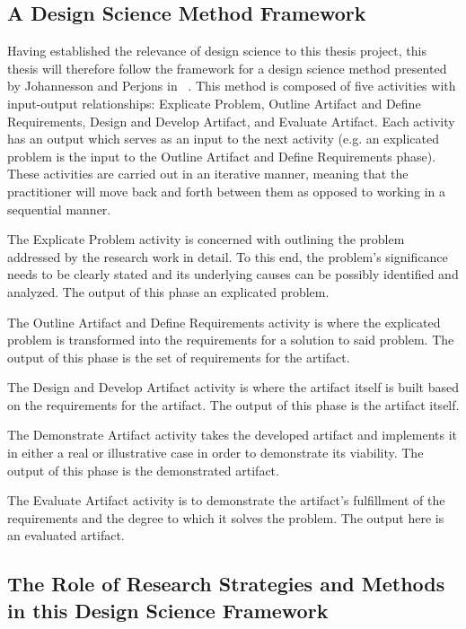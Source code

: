 \subsection{A Design Science Method Framework}
\label{sec:framework}

Having established the relevance of design science to this thesis project, this thesis will therefore follow the framework for a design science method presented by Johannesson and Perjons in ~\cite[Ch. 4]{johannessonPerjons2012}. This method is composed of five activities with input-output relationships: Explicate Problem, Outline Artifact and Define Requirements, Design and Develop Artifact, and Evaluate Artifact. Each activity has an output which serves as an input to the next activity (e.g. an explicated problem is the input to the Outline Artifact and Define Requirements phase). These activities are carried out in an iterative manner, meaning that the practitioner will move back and forth between them as opposed to working in a sequential manner. 

The Explicate Problem activity is concerned with outlining the problem addressed by the research work in detail. To this end, the problem's significance needs to be clearly stated and its underlying causes can be possibly identified and analyzed. The output of this phase an explicated problem. 

The Outline Artifact and Define Requirements activity is where the explicated problem is transformed into the requirements for a solution to said problem. The output of this phase is the set of requirements for the artifact. 

The Design and Develop Artifact activity is where the artifact itself is built based on the requirements for the artifact. The output of this phase is the artifact itself.

The Demonstrate Artifact activity takes the developed artifact and implements it in either a real or illustrative case in order to demonstrate its viability. The output of this phase is the demonstrated artifact. 

The Evaluate Artifact activity is to demonstrate the artifact's fulfillment of the requirements and the degree to which it solves the problem. The output here is an evaluated artifact. 

\subsection{The Role of Research Strategies and Methods in this Design Science Framework}

